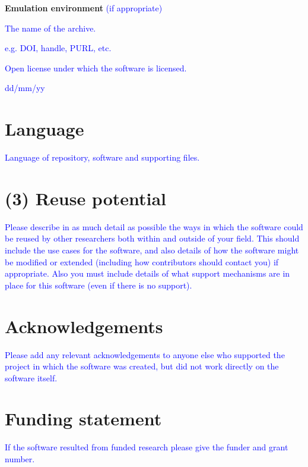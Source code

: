\documentclass{jors}
\begin{document}
{\bf Emulation environment} \textcolor{blue}{(if appropriate)}

\begin{description}[noitemsep,topsep=0pt]
	\item[Name:] \textcolor{blue}{The name of the archive.}
	\item[Persistent identifier:] \textcolor{blue}{e.g. DOI, handle, PURL, etc.}
	\item[Licence:] \textcolor{blue}{Open license under which the software is licensed.}
	\item[Date published:] \textcolor{blue}{dd/mm/yy}
\end{description}

\section*{Language}

\textcolor{blue}{Language of repository, software and supporting files.}

\section*{(3) Reuse potential}

\textcolor{blue}{Please describe in as much detail as possible the ways in which the software could be reused by other researchers both within and outside of your field. This should include the use cases for the software, and also details of how the software might be modified or extended (including how contributors should contact you) if appropriate. Also you must include details of what support mechanisms are in place for this software (even if there is no support).}

\section*{Acknowledgements}

\textcolor{blue}{Please add any relevant acknowledgements to anyone else who supported the project in which the software was created, but did not work directly on the software itself.}

\section*{Funding statement}

\textcolor{blue}{If the software resulted from funded research please give the funder and grant number.}
\end{document}
